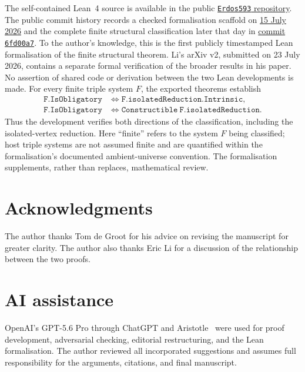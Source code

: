 \documentclass[a4paper,11pt,reqno]{amsart}
\theoremstyle{plain}
\theoremstyle{definition}
\theoremstyle{remark}
\begin{document}
The self-contained Lean~4 source is available in the public
\href{https://github.com/SamPetkov/Erdos593/blob/main/formalization/Erdos593SelfContained.lean}{\texttt{Erdos593} repository}.
The public commit history records a checked formalisation scaffold on
\href{https://github.com/SamPetkov/Erdos593/commit/ba37b8c511ab390c14a905110366d7cac1ffa08f}{15 July 2026}
and the complete finite structural classification later that day in
\href{https://github.com/SamPetkov/Erdos593/commit/6fd00a76064401f3f10aabef474f59d3c6ecd6bf}{commit \texttt{6fd00a7}}.
To the author's knowledge, this is the first publicly timestamped Lean
formalisation of the finite structural theorem.  Li's arXiv v2, submitted on
23 July 2026, contains a separate formal verification of the broader results
in his paper.  No assertion of shared code or derivation between the two Lean
developments is made.
For every finite triple system $F$, the exported theorems establish
\[
\begin{aligned}
\mathtt{F.IsObligatory}
&\Longleftrightarrow \mathtt{F.isolatedReduction.Intrinsic},\\
\mathtt{F.IsObligatory}
&\Longleftrightarrow \mathtt{Constructible\ F.isolatedReduction}.
\end{aligned}
\]
Thus the development verifies both directions of the classification,
including the isolated-vertex reduction.  Here ``finite'' refers to the
system $F$ being classified; host triple systems are not assumed finite and
are quantified within the formalisation's documented ambient-universe
convention.  The formalisation supplements, rather than replaces,
mathematical review.

\section*{Acknowledgments}

The author thanks Tom de Groot for his advice on revising the manuscript for
greater clarity.  The author also thanks Eric Li for a discussion of the
relationship between the two proofs.

\section*{AI assistance}

OpenAI's GPT-5.6 Pro through ChatGPT and Aristotle~\citep{achim-et-al-2025}
were used for proof development, adversarial checking, editorial restructuring,
and the Lean formalisation.  The author reviewed all incorporated suggestions
and assumes full responsibility for the arguments, citations, and final
manuscript.
\end{document}

